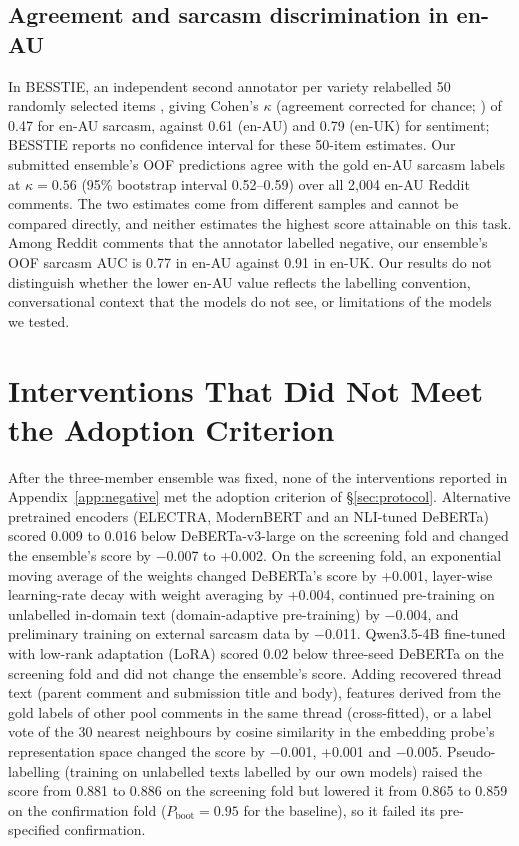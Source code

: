 \documentclass[11pt]{article}
\newcommand{\pboot}{P_{\mathrm{boot}}}
\begin{document}
\subsection{Agreement and sarcasm discrimination in en-AU}
\label{sec:ceiling}
In BESSTIE, an independent second annotator per variety relabelled 50 randomly selected items
\citep[\S2.3]{srirag-etal-2025-besstie}, giving Cohen's $\kappa$
(agreement corrected for chance; \citealp{cohen1960kappa}) of 0.47 for en-AU sarcasm, against 0.61 (en-AU) and 0.79
(en-UK) for sentiment; BESSTIE reports no confidence interval for these 50-item estimates. Our submitted ensemble's OOF predictions agree
with the gold en-AU sarcasm labels at $\kappa=0.56$ (95\% bootstrap interval 0.52--0.59) over all 2,004 en-AU Reddit
comments. The two estimates come from different samples and cannot be compared directly, and neither estimates the
highest score attainable on this task. Among Reddit comments that the annotator labelled negative, our ensemble's OOF sarcasm
AUC is 0.77 in en-AU against 0.91 in en-UK. Our results do not distinguish whether the lower en-AU value reflects the
labelling convention, conversational context that the models do not see, or limitations of the models we tested.

\section{Interventions That Did Not Meet the Adoption Criterion}
\label{sec:negative}
After the three-member ensemble was fixed, none of the interventions reported in Appendix~\ref{app:negative} met the
adoption criterion of \S\ref{sec:protocol}. Alternative pretrained encoders (ELECTRA, ModernBERT and an NLI-tuned DeBERTa) scored 0.009 to
0.016 below DeBERTa-v3-large on the screening fold and changed the ensemble's score by $-$0.007 to +0.002. On the
screening fold, an exponential moving average of the weights changed DeBERTa's score by +0.001, layer-wise
learning-rate decay with weight averaging by +0.004, continued pre-training on unlabelled in-domain text (domain-adaptive pre-training) by $-$0.004,
and preliminary training on external sarcasm data by $-$0.011. Qwen3.5-4B fine-tuned with low-rank adaptation (LoRA)
scored 0.02 below three-seed DeBERTa on the screening fold and did not change the ensemble's score. Adding recovered
thread text (parent comment and submission title and body), features derived from the gold labels of other pool
comments in the same thread (cross-fitted), or a label vote of the 30 nearest neighbours by cosine similarity in the
embedding probe's representation space changed the score by $-$0.001, +0.001 and $-$0.005. Pseudo-labelling (training on
unlabelled texts labelled by our own models) raised the score from 0.881 to 0.886 on the screening fold but lowered it
from 0.865 to 0.859 on the confirmation fold ($\pboot=0.95$ for the baseline), so it failed its pre-specified
confirmation.
\end{document}
